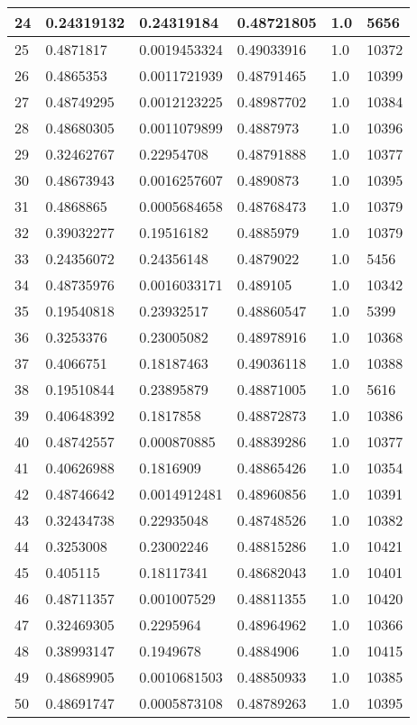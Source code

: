 \begin{longtable}{|l|l|l|l|l|l|}
24 & 0.24319132 & 0.24319184 & 0.48721805 & 1.0 & 5656 \\ \hline 
25 & 0.4871817 & 0.0019453324 & 0.49033916 & 1.0 & 10372 \\ \hline 
26 & 0.4865353 & 0.0011721939 & 0.48791465 & 1.0 & 10399 \\ \hline 
27 & 0.48749295 & 0.0012123225 & 0.48987702 & 1.0 & 10384 \\ \hline 
28 & 0.48680305 & 0.0011079899 & 0.4887973 & 1.0 & 10396 \\ \hline 
29 & 0.32462767 & 0.22954708 & 0.48791888 & 1.0 & 10377 \\ \hline 
30 & 0.48673943 & 0.0016257607 & 0.4890873 & 1.0 & 10395 \\ \hline 
31 & 0.4868865 & 0.0005684658 & 0.48768473 & 1.0 & 10379 \\ \hline 
32 & 0.39032277 & 0.19516182 & 0.4885979 & 1.0 & 10379 \\ \hline 
33 & 0.24356072 & 0.24356148 & 0.4879022 & 1.0 & 5456 \\ \hline 
34 & 0.48735976 & 0.0016033171 & 0.489105 & 1.0 & 10342 \\ \hline 
35 & 0.19540818 & 0.23932517 & 0.48860547 & 1.0 & 5399 \\ \hline 
36 & 0.3253376 & 0.23005082 & 0.48978916 & 1.0 & 10368 \\ \hline 
37 & 0.4066751 & 0.18187463 & 0.49036118 & 1.0 & 10388 \\ \hline 
38 & 0.19510844 & 0.23895879 & 0.48871005 & 1.0 & 5616 \\ \hline 
39 & 0.40648392 & 0.1817858 & 0.48872873 & 1.0 & 10386 \\ \hline 
40 & 0.48742557 & 0.000870885 & 0.48839286 & 1.0 & 10377 \\ \hline 
41 & 0.40626988 & 0.1816909 & 0.48865426 & 1.0 & 10354 \\ \hline 
42 & 0.48746642 & 0.0014912481 & 0.48960856 & 1.0 & 10391 \\ \hline 
43 & 0.32434738 & 0.22935048 & 0.48748526 & 1.0 & 10382 \\ \hline 
44 & 0.3253008 & 0.23002246 & 0.48815286 & 1.0 & 10421 \\ \hline 
45 & 0.405115 & 0.18117341 & 0.48682043 & 1.0 & 10401 \\ \hline 
46 & 0.48711357 & 0.001007529 & 0.48811355 & 1.0 & 10420 \\ \hline 
47 & 0.32469305 & 0.2295964 & 0.48964962 & 1.0 & 10366 \\ \hline 
48 & 0.38993147 & 0.1949678 & 0.4884906 & 1.0 & 10415 \\ \hline 
49 & 0.48689905 & 0.0010681503 & 0.48850933 & 1.0 & 10385 \\ \hline 
50 & 0.48691747 & 0.0005873108 & 0.48789263 & 1.0 & 10395 \\ \hline 
\end{longtable}